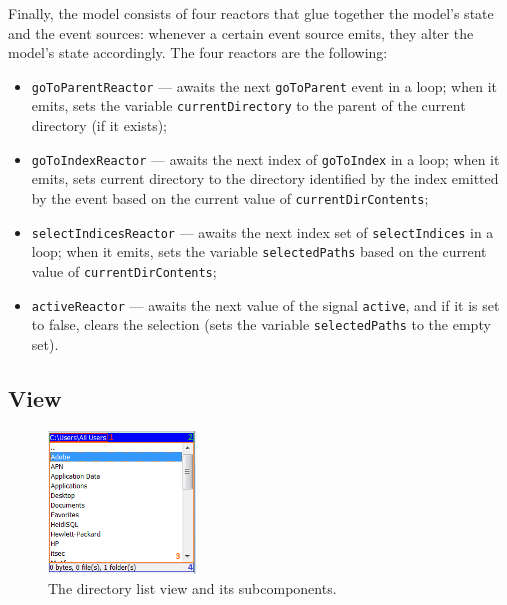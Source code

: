 Finally, the model consists of four reactors that glue together the model's state and the event sources: whenever a certain event source emits, they alter the model's state accordingly. The four reactors are the following:
\begin{itemize}
\item \texttt{goToParentReactor} --- awaits the next \texttt{goToParent} event in a loop; when it emits, sets the variable \texttt{currentDirectory} to the parent of the current directory (if it exists);
\item \texttt{goToIndexReactor} --- awaits the next index of \texttt{goToIndex} in a loop; when it emits, sets current directory to the directory identified by the index emitted by the event based on the current value of \texttt{currentDirContents};
\item \texttt{selectIndicesReactor} --- awaits the next index set of \texttt{selectIndices} in a loop; when it emits, sets the variable \texttt{selectedPaths} based on the current value of \texttt{currentDirContents};
\item \texttt{activeReactor} --- awaits the next value of the signal \texttt{active}, and if it is set to false, clears the selection (sets the variable \texttt{selectedPaths} to the empty set).
\end{itemize}

\subsection{View}

\begin{figure}
  \centering
    \includegraphics[width=0.35\textwidth]{images/scala-commander-directoryListView.png}
  \caption{The directory list view and its subcomponents.}
  \label{fig:scomm_main}  
\end{figure}

